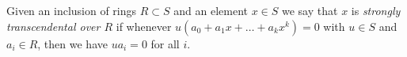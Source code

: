 \begin{definition}
\label{definition-strongly-transcendental}
Given an inclusion of rings $R \subset S$ and
an element $x \in S$ we say that $x$ is
{\it strongly transcendental over $R$} if
whenever $u(a_0 + a_1 x + \ldots + a_k x^k) = 0$
with $u \in S$ and $a_i \in R$, then
we have $ua_i = 0$ for all $i$.
\end{definition}
